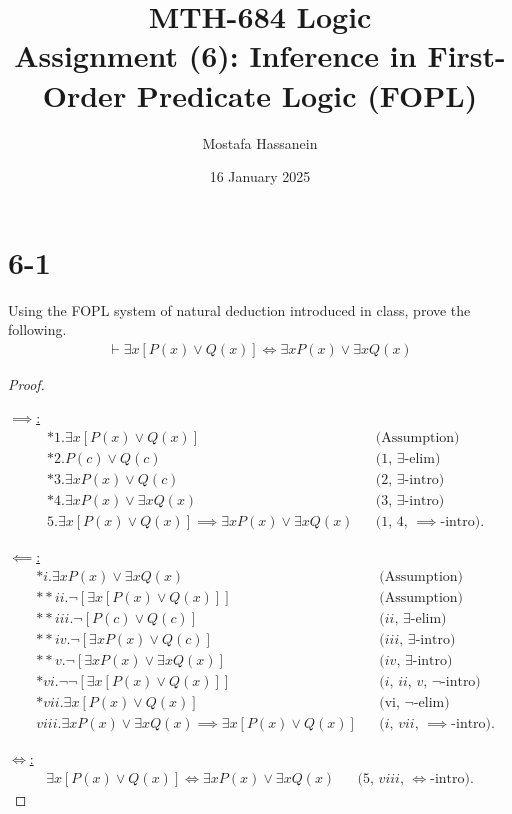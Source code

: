 \documentclass{article}
\author{Mostafa Hassanein}
\title{
  MTH-684 Logic \\
  Assignment (6): Inference in First-Order Predicate Logic (FOPL)}
\date{16 January 2025}
\begin{document}
\maketitle
\newpage

\section*{6-1}
Using the FOPL system of natural deduction introduced in class, prove the following.
\begin{align*}
  \vdash 
  \exists x \left[ P(x) \lor Q(x) \right]
  \iff
  \exists x P(x) \lor \exists x Q(x)
\end{align*}

\begin{proof}
  $ $

  \underline{$\implies$:}
  \begin{align*}
    &*1. \exists x \left[ P(x) \lor Q(x) \right] &&\text{(Assumption)} \\
    &*2. P(c) \lor Q(c) &&\text{($1$, $\exists$-elim)} \\
    &*3. \exists x P(x) \lor Q(c) &&\text{($2$, $\exists$-intro)} \\
    &*4. \exists x P(x) \lor \exists x Q(x) &&\text{($3$, $\exists$-intro)} \\
    &5. \exists x \left[ P(x) \lor Q(x) \right]
    \implies
    \exists x P(x) \lor \exists x Q(x) &&\text{($1$, $4$, $\implies$-intro)}.
  \end{align*}

  \underline{$\impliedby$:}
  \begin{align*}
    &*i. \exists x P(x) \lor \exists x Q(x) &&\text{(Assumption)} \\
    &**ii. \lnot \left[ \exists x \left[ P(x) \lor Q(x) \right] \right] &&\text{(Assumption)} \\
    &**iii. \lnot \left[ P(c) \lor Q(c) \right] &&\text{($ii$, $\exists$-elim)} \\
    &**iv. \lnot \left[ \exists x P(x) \lor Q(c) \right] &&\text{($iii$, $\exists$-intro)} \\
    &**v. \lnot \left[ \exists x P(x) \lor \exists x Q(x) \right] &&\text{($iv$, $\exists$-intro)} \\
    &*vi. \lnot \lnot \left[ \exists x \left[ P(x) \lor Q(x) \right] \right]  &&\text{($i$, $ii$, $v$, $\lnot$-intro)} \\
    &*vii. \exists x \left[ P(x) \lor Q(x) \right] &&\text{(vi, $\lnot$-elim)} \\
    &viii. \exists x P(x) \lor \exists x Q(x)
    \implies
    \exists x \left[ P(x) \lor Q(x) \right] &&\text{($i$, $vii$, $\implies$-intro)}.
  \end{align*}

  \underline{$\iff$:}
  \begin{align*}
    \exists x \left[ P(x) \lor Q(x) \right]
    \iff
    \exists x P(x) \lor \exists x Q(x) &&\text{($5$, $viii$, $\iff$-intro)}.
  \end{align*}

\end{proof}
\end{document}
